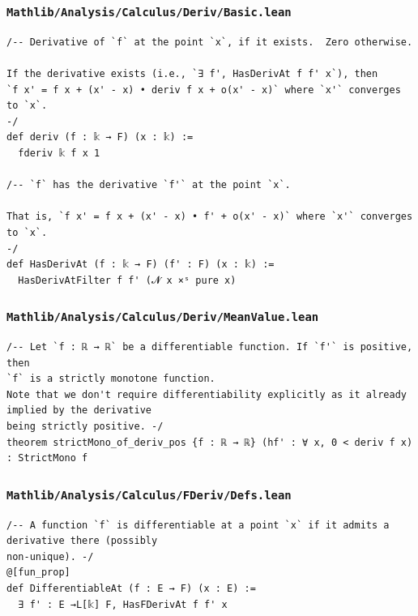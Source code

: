 \subsubsection{\texttt{Mathlib/Analysis/Calculus/Deriv/Basic.lean}}
\begin{lstlisting}[language=lean]
/-- Derivative of `f` at the point `x`, if it exists.  Zero otherwise.

If the derivative exists (i.e., `∃ f', HasDerivAt f f' x`), then
`f x' = f x + (x' - x) • deriv f x + o(x' - x)` where `x'` converges to `x`.
-/
def deriv (f : 𝕜 → F) (x : 𝕜) :=
  fderiv 𝕜 f x 1

/-- `f` has the derivative `f'` at the point `x`.

That is, `f x' = f x + (x' - x) • f' + o(x' - x)` where `x'` converges to `x`.
-/
def HasDerivAt (f : 𝕜 → F) (f' : F) (x : 𝕜) :=
  HasDerivAtFilter f f' (𝓝 x ×ˢ pure x)
\end{lstlisting}

\subsubsection{\texttt{Mathlib/Analysis/Calculus/Deriv/MeanValue.lean}}
\begin{lstlisting}[language=lean]
/-- Let `f : ℝ → ℝ` be a differentiable function. If `f'` is positive, then
`f` is a strictly monotone function.
Note that we don't require differentiability explicitly as it already implied by the derivative
being strictly positive. -/
theorem strictMono_of_deriv_pos {f : ℝ → ℝ} (hf' : ∀ x, 0 < deriv f x) : StrictMono f
\end{lstlisting}

\subsubsection{\texttt{Mathlib/Analysis/Calculus/FDeriv/Defs.lean}}
\begin{lstlisting}[language=lean]
/-- A function `f` is differentiable at a point `x` if it admits a derivative there (possibly
non-unique). -/
@[fun_prop]
def DifferentiableAt (f : E → F) (x : E) :=
  ∃ f' : E →L[𝕜] F, HasFDerivAt f f' x
\end{lstlisting}

\newpage
